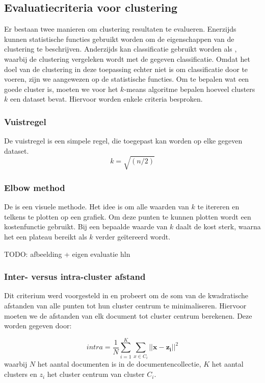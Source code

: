 \subsection{Evaluatiecriteria voor clustering}\label{evaluatie-clustering}
Er bestaan twee manieren om clustering resultaten te evalueren. Enerzijds kunnen statistische functies gebruikt worden om de eigenschappen van de clustering te beschrijven. Anderzijds kan classificatie gebruikt worden als , waarbij de clustering vergeleken wordt met de gegeven classificatie. Omdat het doel van de clustering in deze toepassing echter niet is om classificatie door te voeren, zijn we aangewezen op de statistische functies. Om te bepalen wat een goede cluster is, moeten we voor het $k$-means algoritme bepalen hoeveel clusters $k$ een dataset bevat. Hiervoor worden enkele criteria besproken.

\subsubsection{Vuistregel}
De vuistregel is een simpele regel, die toegepast kan worden op elke gegeven dataset. 
\begin{equation}
k = \sqrt{(n/2)}
\end{equation}

\subsubsection{Elbow method}
De  \cite{Science2013} is een visuele methode. Het idee is om alle waarden van $k$ te itereren en telkens te plotten op een grafiek. Om deze punten te kunnen plotten wordt een kostenfunctie gebruikt. Bij een bepaalde waarde van $k$ daalt de kost sterk, waarna het een plateau bereikt als $k$ verder ge\"itereerd wordt.

TODO: afbeelding + eigen evaluatie hln

\subsubsection{Inter- versus intra-cluster afstand}
Dit criterium werd voorgesteld in \cite{Ray} en probeert om de som van de kwadratische afstanden van alle punten tot hun cluster centrum te minimaliseren. Hiervoor moeten we de afstanden van elk document tot cluster centrum berekenen. Deze worden gegeven door:

\begin{equation}
intra = \frac{1}{N}\sum_{i=1}^{K}\sum_{x\in{C_i}}^{} \vert\vert \mathbf{x-z_i} \vert\vert ^2 
\end{equation}
waarbij $N$ het aantal documenten is in de documentencollectie, $K$ het aantal clusters en $z_i$ het cluster centrum van cluster $C_i$.

